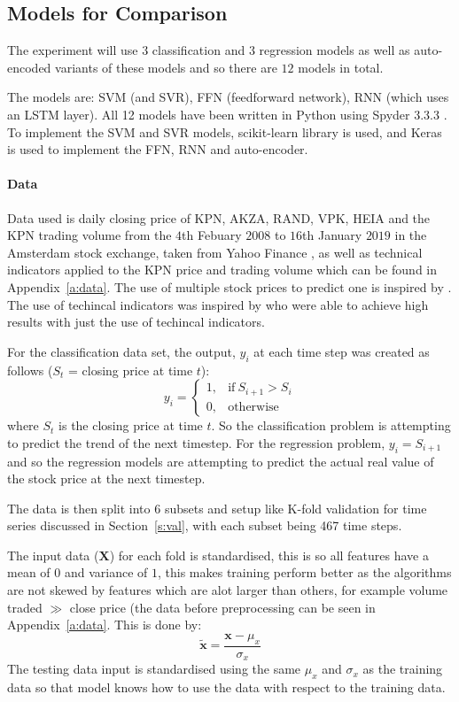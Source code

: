 \documentclass[11pt,a4paper]{article}
\numberwithin{equation}{section}
\begin{document}
\subsection{Models for Comparison}
\label{ss:models}
The experiment will use $3$ classification and $3$ regression models as well as auto-encoded variants of these models and so there are $12$ models in total.

The models are: SVM (and SVR), FFN (feedforward network), RNN (which uses an LSTM layer). All 12 models have been written in Python using Spyder 3.3.3 \cite{spyder}. To implement the SVM and SVR models, scikit-learn library \cite{sklearn} is used, and Keras \cite{keras} is used to implement the FFN, RNN and auto-encoder.

\paragraph{Data}
\label{ss:data}
Data used is daily closing price of KPN, AKZA, RAND, VPK, HEIA and the KPN trading volume from the $4$th Febuary $2008$ to $16$th January $2019$ in the Amsterdam stock exchange, taken from Yahoo Finance \cite{kpn}, as well as technical indicators applied to the KPN price and trading volume which can be found in Appendix~\ref{a:data}. The use of multiple stock prices to predict one is inspired by \cite{siri2018}. The use of techincal indicators was inspired by \cite{kim2003, qian2017} who were able to achieve high results with just the use of techincal indicators.

For the classification data set, the output, $y_{i}$ at each time step was created as follows ($S_{t}$ = closing price at time $t$):
\[
y_{i} =
    \begin{cases}
      1, & \text{if}\ S_{i+1} > S_{i} \\
      0, & \text{otherwise}
    \end{cases}
\]
where $S_{t}$ is the closing price at time $t$. So the classification problem is attempting to predict the trend of the next timestep. For the regression problem, $y_{i} = S_{i+1}$ and so the regression models are attempting to predict the actual real value of the stock price at the next timestep.

The data is then split into $6$ subsets and setup like K-fold validation for time series discussed in Section~\ref{s:val}, with each subset being 467 time steps.

The input data ($\mathbf{X}$) for each fold is standardised, this is so all features have a mean of $0$ and variance of $1$, this makes training perform better as the algorithms are not skewed by features which are alot larger than others, for example volume traded $\gg$ close price (the data before preprocessing can be seen in Appendix~\ref{a:data}. This is done by:
\[
\tilde{\mathbf{x}} = \frac{\mathbf{x} - \mu_{x}}{\sigma_{x}}
\]
The testing data input is standardised using the same $\mu_{x}$ and $\sigma_{x}$ as the training data so that model knows how to use the data with respect to the training data.
\end{document}
